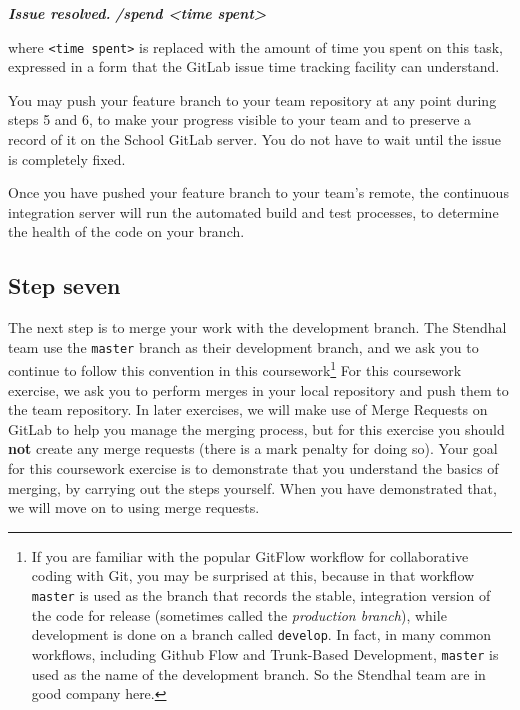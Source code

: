 \documentclass[
]{book}
\newenvironment{Shaded}{\begin{snugshade}}{\end{snugshade}}
\newcommand{\InformationTok}[1]{\textcolor[rgb]{0.56,0.35,0.01}{\textbf{\textit{#1}}}}
\begin{document}
\begin{Shaded}
\begin{Highlighting}[]
\InformationTok{    Issue resolved.}
\InformationTok{    /spend \textless{}time spent\textgreater{}}
\end{Highlighting}
\end{Shaded}

where \texttt{\textless{}time\ spent\textgreater{}} is replaced with the amount of time you spent on this task, expressed in a form that the GitLab issue time tracking facility can understand.

You may push your feature branch to your team repository at any point during steps 5 and 6, to make your progress visible to your team and to preserve a record of it on the School GitLab server. You do not have to wait until the issue is completely fixed.

Once you have pushed your feature branch to your team's remote, the continuous integration server will run the automated build and test processes, to determine the health of the code on your branch.

\hypertarget{stepseven}{%
\subsection{Step seven}\label{stepseven}}

The next step is to merge your work with the development branch. The Stendhal team use the \texttt{master} branch as their development branch, and we ask you to continue to follow this convention in this coursework\footnote{If you are familiar with the popular GitFlow workflow for collaborative coding with Git, you may be surprised at this, because in that workflow \texttt{master} is used as the branch that records the stable, integration version of the code for release (sometimes called the \emph{production branch}), while development is done on a branch called \texttt{develop}. In fact, in many common workflows, including Github Flow and Trunk-Based Development, \texttt{master} is used as the name of the development branch. So the Stendhal team are in good company here.} For this coursework exercise, we ask you to perform merges in your local repository and push them to the team repository. In later exercises, we will make use of Merge Requests on GitLab to help you manage the merging process, but for this exercise you should \textbf{not} create any merge requests (there is a mark penalty for doing so). Your goal for this coursework exercise is to demonstrate that you understand the basics of merging, by carrying out the steps yourself. When you have demonstrated that, we will move on to using merge requests.
\end{document}
